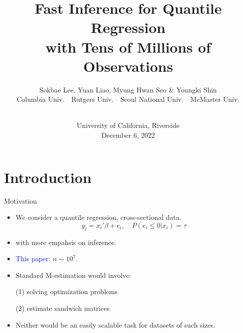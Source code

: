 \documentclass[beamer, t]{beamer}
\begin{document}
\title{Fast Inference for Quantile Regression \\ 
with Tens of Millions of Observations}
\author[Lee, Liao, Seo \& Shin]{Sokbae Lee, Yuan Liao, Myung Hwan Seo \& Youngki Shin \\
\vskip5pt
\footnotesize Columbia Univ.~~Rutgers Univ.~~Seoul National Univ.~~McMaster Univ.}
\date{\\
University of California, Riverside\\
December 6, 2022}
\maketitle







\section{Introduction}


\begin{frame}{Motivation}
	
	\begin{itemize}
		
		\item We consider a quantile regression, cross-sectional data.
		$$
		y_i = x_i'\beta+ e_i,\quad P(e_i\leq 0|x_i)= \tau
		$$
		
		\item with more empahsis  on inference. 
		
		\medskip
		
		\item \textcolor{blue}{This paper:} $n\sim 10^7.$
		
		\item  Standard M-estimation would involve:
		
		(1) solving  optimization problems
		
		(2) estimate sandwich matrices
		
		
		\medskip
		\item  
		Neither  would be an easily scalable task for datasets of such sizes.  
		
	\end{itemize}
	
\end{frame}
\end{document}
